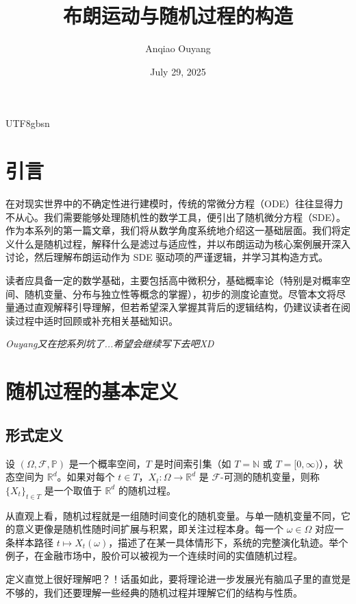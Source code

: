 \documentclass{article}
\title{布朗运动与随机过程的构造}
\author{Anqiao Ouyang}
\date{July 29, 2025}
\begin{document}
\begin{CJK*}{UTF8}{gbsn}

\maketitle

\section{引言}

在对现实世界中的不确定性进行建模时，传统的常微分方程（ODE）往往显得力不从心。我们需要能够处理随机性的数学工具，便引出了随机微分方程（SDE）。作为本系列的第一篇文章，我们将从数学角度系统地介绍这一基础层面。我们将定义什么是随机过程，解释什么是滤过与适应性，并以布朗运动为核心案例展开深入讨论，然后理解布朗运动作为 SDE 驱动项的严谨逻辑，并学习其构造方式。

读者应具备一定的数学基础，主要包括高中微积分，基础概率论（特别是对概率空间、随机变量、分布与独立性等概念的掌握），初步的测度论直觉。尽管本文将尽量通过直观解释引导理解，但若希望深入掌握其背后的逻辑结构，仍建议读者在阅读过程中适时回顾或补充相关基础知识。

\textit{Ouyang又在挖系列坑了...希望会继续写下去吧XD}

\section{随机过程的基本定义}

\subsection{形式定义}

\begin{definition}[随机过程]
设 $(\Omega, \mathcal{F}, \mathbb{P})$ 是一个概率空间，$T$ 是时间索引集（如 $T = \mathbb{N}$ 或 $T = [0, \infty)$），状态空间为 $\mathbb{R}^d$。如果对每个 $t \in T$，$X_t : \Omega \to \mathbb{R}^d$ 是 $\mathcal{F}$-可测的随机变量，则称 $\{X_t\}_{t \in T}$ 是一个取值于 $\mathbb{R}^d$ 的随机过程。
\end{definition}

从直观上看，随机过程就是一组随时间变化的随机变量。与单一随机变量不同，它的意义更像是随机性随时间扩展与积累，即关注过程本身。每一个 $\omega \in \Omega$ 对应一条样本路径 $t \mapsto X_t(\omega)$，描述了在某一具体情形下，系统的完整演化轨迹。举个例子，在金融市场中，股价可以被视为一个连续时间的实值随机过程。

定义直觉上很好理解吧？！话虽如此，要将理论进一步发展光有脑瓜子里的直觉是不够的，我们还要理解一些经典的随机过程并理解它们的结构与性质。


\end{CJK*}
\end{document}
